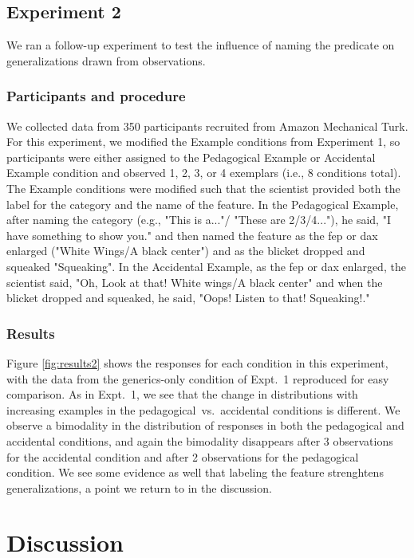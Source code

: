 \documentclass[10pt,letterpaper]{article}
\begin{document}
\subsection{Experiment 2}

We ran a follow-up experiment to test the influence of naming the predicate on generalizations drawn from observations.

\subsubsection{Participants and procedure}

We collected data from 350 participants recruited from Amazon Mechanical Turk.
For this experiment, we modified the Example conditions from Experiment 1, so participants were either assigned to the Pedagogical Example or Accidental Example condition and observed 1, 2, 3, or 4 exemplars (i.e., 8 conditions total). The Example conditions were modified such that the scientist provided both the label for the category and the name of the feature. In the Pedagogical Example, after naming the category (e.g., "This is a..."/ "These are 2/3/4..."), he said, "I have something to show you." and then named the feature as the fep or dax enlarged ("White Wings/A black center") and as the blicket dropped and squeaked "Squeaking".
In the Accidental Example, as the fep or dax enlarged, the scientist said, "Oh, Look at that! White wings/A black center" and when the blicket dropped and squeaked, he said, "Oops! Listen to that! Squeaking!." 

\subsubsection{Results}

Figure \ref{fig:results2} shows the responses for each condition in this experiment, with the data from the generics-only condition of Expt.~1 reproduced for easy comparison. 
As in Expt.~1, we see that the change in distributions with increasing examples in the pedagogical~vs.~accidental conditions is different. We observe a bimodality in the distribution of responses in both the pedagogical and accidental conditions, and again the bimodality disappears after 3 observations for the accidental condition and after 2 observations for the pedagogical condition. We see some evidence as well that labeling the feature strenghtens generalizations, a point we return to in the discussion.

\section{Discussion}
\end{document}
